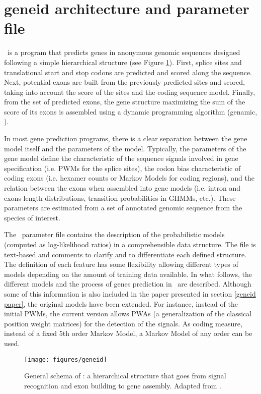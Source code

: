 \section{geneid architecture and parameter file}

\geneid\ is a program that predicts genes in anonymous genomic sequences 
designed following a simple hierarchical structure (see Figure
\ref{geneid}). First, splice sites and translational start and stop 
codons are predicted and scored along the sequence. Next, potential
exons are built from the previously predicted sites and scored,
taking into account the score of the sites and the coding sequence
model.  Finally, from the set of predicted exons, the gene structure
maximizing the sum of the score of its exons is assembled using a
dynamic programming algorithm (genamic, \cite{guigo:1998a}).

In most gene prediction programs, there is a clear separation between
the gene model itself and the parameters of the model. Typically, the
parameters of the gene model define the characteristic of the sequence
signals involved in gene specification (i.e. PWMs for the splice
sites), the codon bias characteristic of coding exons (i.e. hexamer
counts or Markov Models for coding regions), and the relation between
the exons when assembled into gene models (i.e. intron and exons
length distributions, transition probabilities in GHMMs, etc.). These
parameters are estimated from a set of annotated genomic sequence from
the species of interest.

The \geneid\ parameter file contains the description of the
probabilistic models (computed as log-likelihood ratios) in a
comprehensible data structure. The file is text-based and comments to
clarify and to differentiate each defined structure. The definition of
each feature has some flexibility allowing different types of models
depending on the amount of training data available. In what follows,
the different models and the process of genes prediction in
\geneid\ are described. Although some of this information is also
included in the paper presented in section \ref{geneid paper}, the
original models have been extended.  For instance, instead of the
initial PWMs, the current version allows PWAs (a generalization of the
classical position weight matrices) for the detection of the
signals. As coding measure, instead of a fixed 5th order Markov Model,
a Markov Model of any order can be used.


\begin{figure}
\begin{center}
\texttt{[image: figures/geneid]}
\caption{General schema of \geneid: a hierarchical structure that goes 
from signal recognition and exon building to gene assembly. Adapted from
\cite{blanco:2000a}.}
\label{geneid}
\end{center}
\end{figure}


